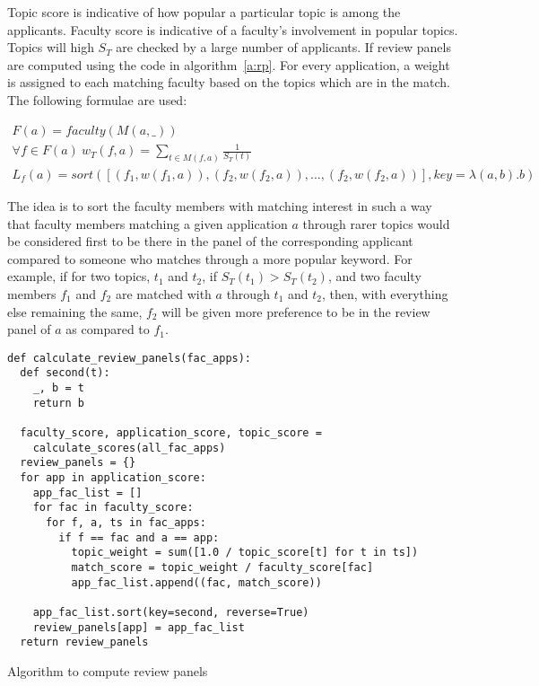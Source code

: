 \documentclass[12pt,a4paper]{article}
\begin{document}
Topic score is indicative of how popular a particular topic is among the applicants. Faculty score is indicative of a faculty's involvement in popular topics. Topics will high $S_T$ are checked by a large number of applicants. If review panels are computed using the code in algorithm~\ref{a:rp}. For every application, a weight is assigned to each matching faculty based on the topics which are in the match. The following formulae are used:

\begin{eqnarray}
F(a) = faculty(M(a, \_)) \\
\forall f \in F(a)\ w_T(f, a) = \sum_{t\in M(f, a)} \frac{1}{S_T(t)} \\
L_f(a) = sort([(f_1, w(f_1, a)), (f_2, w(f_2, a)), ..., (f_2, w(f_2, a))], key=\lambda(a, b). b)
\end{eqnarray}

The idea is to sort the faculty members with matching interest in such a way that faculty members matching a given application $a$ through rarer topics would be considered first to be there in the panel of the corresponding applicant compared to someone who matches through a more popular keyword. For example, if for two topics, $t_1$ and $t_2$, if $S_T(t_1) > S_T(t_2)$, and two faculty members $f_1$ and $f_2$ are matched with $a$ through $t_1$ and $t_2$, then, with everything else remaining the same, $f_2$ will be given more preference to be in the review panel of $a$ as compared to $f_1$.
\begin{algorithm}
\begin{lstlisting}[frame=single]
def calculate_review_panels(fac_apps):
  def second(t):
    _, b = t
    return b

  faculty_score, application_score, topic_score =
    calculate_scores(all_fac_apps)
  review_panels = {}
  for app in application_score:
    app_fac_list = []
    for fac in faculty_score:
      for f, a, ts in fac_apps:
        if f == fac and a == app:
          topic_weight = sum([1.0 / topic_score[t] for t in ts])
          match_score = topic_weight / faculty_score[fac]
          app_fac_list.append((fac, match_score))

    app_fac_list.sort(key=second, reverse=True)
    review_panels[app] = app_fac_list
  return review_panels
\end{lstlisting}
\caption{Algorithm to compute review panels}
\label{a:rp}
\end{algorithm}
\end{document}
